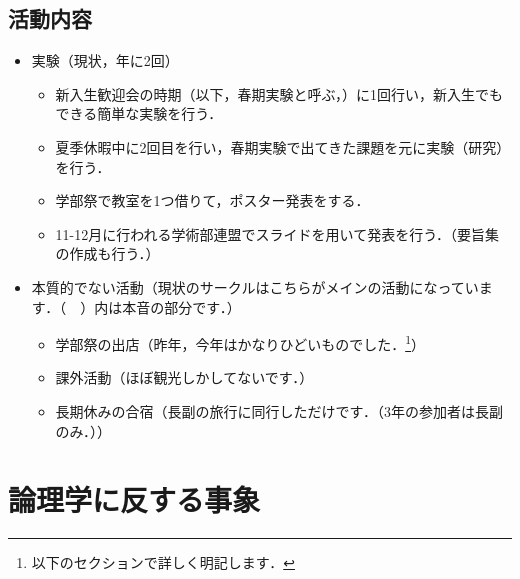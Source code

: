 \documentclass[a4paper,11pt]{ltjsarticle}
\begin{document}
\subsection{活動内容}

\begin{itemize}
    \item 実験（現状，年に2回）
    \begin{itemize}
        \item 新入生歓迎会の時期（以下，春期実験と呼ぶ，）に1回行い，新入生でもできる簡単な実験を行う．
        \item 夏季休暇中に2回目を行い，春期実験で出てきた課題を元に実験（研究）を行う．
        \item 学部祭で教室を1つ借りて，ポスター発表をする．
        \item 11-12月に行われる学術部連盟でスライドを用いて発表を行う．（要旨集の作成も行う．）
    \end{itemize}
    \item 本質的でない活動（現状のサークルはこちらがメインの活動になっています．（　）内は本音の部分です．）
    \begin{itemize}
        \item 学部祭の出店（昨年，今年はかなりひどいものでした．\footnote{以下のセクションで詳しく明記します．}）
        \item 課外活動（ほぼ観光しかしてないです．）
        \item 長期休みの合宿（長副の旅行に同行しただけです．（3年の参加者は長副のみ．））
    \end{itemize}
\end{itemize}

\clearpage

\section{論理学に反する事象}
\end{document}
